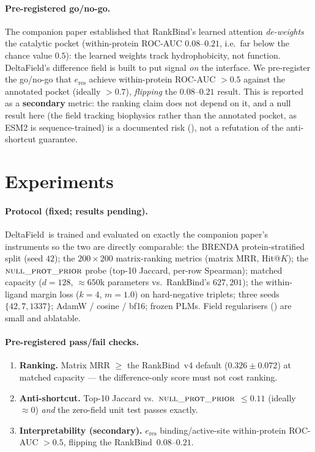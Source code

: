 \documentclass[11pt,a4paper]{article}
\newcommand{\df}{DeltaField\xspace}
\newcommand{\method}{RankBind\xspace}
\newcommand{\nullprior}{\textsc{null\_prot\_prior}\xspace}
\begin{document}
\paragraph{Pre-registered go/no-go.}
The companion paper established that \method's learned attention
\emph{de-weights} the catalytic pocket (within-protein ROC-AUC $0.08$--$0.21$,
i.e.\ far below the chance value $0.5$): the learned weights track
hydrophobicity, not function. \df's difference field is built to put signal
\emph{on} the interface. We pre-register the go/no-go that $e_{\text{res}}$
achieve within-protein ROC-AUC $>0.5$ against the annotated pocket (ideally
$>0.7$), \emph{flipping} the $0.08$--$0.21$ result. This is reported as a
\textbf{secondary} metric: the ranking claim does not depend on it, and a null
result here (the field tracking biophysics rather than the annotated pocket,
as ESM2 is sequence-trained) is a documented risk (),
not a refutation of the anti-shortcut guarantee.

\section{Experiments}
\label{sec:exp}

\paragraph{Protocol (fixed; results pending).}
\df\ is trained and evaluated on exactly the companion paper's instruments so
the two are directly comparable: the BRENDA protein-stratified split (seed
$42$); the $200\times200$ matrix-ranking metrics (matrix MRR, Hit@$K$); the
$\nullprior$ probe (top-10 Jaccard, per-row Spearman); matched capacity
($d=128$, $\approx\!650$k parameters vs.\ \method's $627{,}201$); the
within-ligand margin loss ($k=4$, $m=1.0$) on hard-negative triplets; three
seeds $\{42,7,1337\}$; AdamW / cosine / bf16; frozen PLMs. Field regularisers
() are small and ablatable.

\paragraph{Pre-registered pass/fail checks.}
\begin{enumerate}[leftmargin=*,itemsep=1pt,topsep=2pt]
  \item[(A)] \textbf{Ranking.} Matrix MRR $\ge$ the \method\ v4 default
        ($0.326\pm0.072$) at matched capacity --- the difference-only score
        must not cost ranking.
  \item[(B)] \textbf{Anti-shortcut.} Top-10 Jaccard vs.\ $\nullprior$
        $\le 0.11$ (ideally $\approx0$) \emph{and} the zero-field unit test
        passes exactly.
  \item[(C)] \textbf{Interpretability (secondary).} $e_{\text{res}}$
        binding/active-site within-protein ROC-AUC $>0.5$, flipping the
        \method\ $0.08$--$0.21$.
\end{enumerate}
\end{document}
